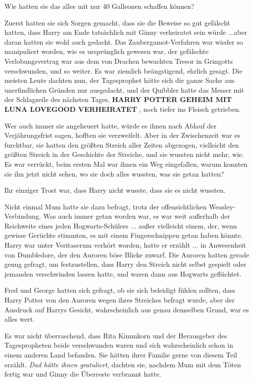 Wie hatten sie das alles mit nur 40 Galleonen schaffen können?

Zuerst hatten sie sich Sorgen gemacht, dass sie die Beweise so gut gefälscht
hatten, dass Harry am Ende tatsächlich mit Ginny verheiratet sein würde ...aber
daran hatten sie wohl auch gedacht. Das Zaubergamot-Verfahren war wieder so
manipuliert worden, wie es ursprünglich gewesen war, der gefälschte
Verlobungsvertrag war aus dem von Drachen bewachten Tresor in Gringotts
verschwunden, und so weiter. Es war ziemlich beängstigend, ehrlich gesagt. Die
meisten Leute dachten nun, der Tagesprophet hätte sich die ganze Sache aus
unerfindlichen Gründen nur ausgedacht, und der Quibbler hatte das Messer mit der
Schlagzeile des nächsten Tages, \textbf{HARRY POTTER GEHEIM MIT LUNA LOVEGOOD
VERHEIRATET} , noch tiefer ins Fleisch getrieben.

Wer auch immer sie angeheuert hatte, würde es ihnen nach Ablauf der
Verjährungsfrist sagen, hofften sie verzweifelt. Aber in der Zwischenzeit war es
furchtbar, sie hatten den größten Streich aller Zeiten abgezogen, vielleicht den
größten Streich in der Geschichte der Streiche, und sie wussten nicht mehr, wie.
Es war verrückt, beim ersten Mal war ihnen ein Weg eingefallen, warum konnten
sie ihn jetzt nicht sehen, wo sie doch alles wussten, was sie getan hatten?

Ihr einziger Trost war, dass Harry nicht wusste, dass sie es nicht wussten.

Nicht einmal Mum hatte sie dazu befragt, trotz der offensichtlichen
Weasley-Verbindung. Was auch immer getan worden war, es war weit außerhalb der
Reichweite eines jeden Hogwarts-Schülers ... außer vielleicht einem, der, wenn
gewisse Gerüchte stimmten, es mit einem Fingerschnippen getan haben könnte.
Harry war unter Veritaserum verhört worden, hatte er erzählt ... in Anwesenheit
von Dumbledore, der den Auroren böse Blicke zuwarf. Die Auroren hatten gerade
genug gefragt, um festzustellen, dass Harry den Streich nicht selbst gespielt
oder jemanden verschwinden lassen hatte, und waren dann aus Hogwarts geflüchtet.

Fred und George hatten sich gefragt, ob sie sich beleidigt fühlen sollten, dass
Harry Potter von den Auroren wegen ihres Streiches befragt wurde, aber der
Ausdruck auf Harrys Gesicht, wahrscheinlich aus genau demselben Grund, war es
alles wert.

Es war nicht überraschend, dass Rita Kimmkorn und der Herausgeber des
Tagespropheten beide verschwunden waren und sich wahrscheinlich schon in einem
anderen Land befanden. Sie hätten ihrer Familie gerne von diesem Teil erzählt.
\emph{Dad hätte ihnen gratuliert,} dachten sie, nachdem Mum mit dem Töten fertig
war und Ginny die Überreste verbrannt hatte.

